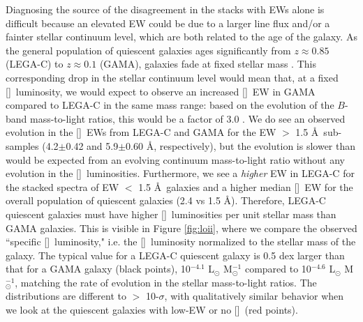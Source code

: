\documentclass[twocolumn,natbib,iop,hyperref]{aastex62}
\newcommand{\oii}{[\ion{O}{2}]}
\begin{document}
Diagnosing the source of the disagreement in the stacks with EWs alone is difficult because an elevated EW could be due to a larger line flux and/or a fainter stellar continuum level, which are both related to the age of the galaxy.  As the general population of quiescent galaxies ages significantly from $z\approx0.85$ (LEGA-C) to $z\approx0.1$ (GAMA), galaxies  fade at fixed stellar mass \cite[e.g.][]{2005ApJ...633..174T}.  This corresponding drop in the stellar continuum level would mean that, at a fixed \oii\ luminosity, we would expect to observe an increased \oii\ EW in GAMA compared to LEGA-C in the same mass range: based on the evolution of the $B$-band mass-to-light ratios, this would be a factor of 3.0 \citep{2005ApJ...631..145V}.  We do see an observed evolution in the \oii\ EWs from LEGA-C and GAMA for the EW $>$ 1.5 \AA\ sub-samples (4.2$\pm$0.42 and 5.9$\pm$0.60 \AA, respectively), but the evolution is slower than would be expected from an evolving continuum mass-to-light ratio without any evolution in the \oii\ luminosities.  Furthermore, we see a \textit{higher} EW in LEGA-C for the stacked spectra of EW $<$ 1.5 \AA\ galaxies and a higher median \oii\ EW for the overall population of quiescent galaxies (2.4 vs 1.5 \AA).  Therefore, LEGA-C quiescent galaxies must have higher \oii\ luminosities per unit stellar mass than GAMA galaxies.  This is visible in Figure \ref{fig:loii}, where we compare the observed ``specific \oii\ luminosity," i.e. the \oii\ luminosity normalized to the stellar mass of the galaxy.  The typical value for a LEGA-C quiescent galaxy is 0.5 dex larger than that for a GAMA galaxy (black points), 10$^{-4.1}$ L$_{\odot}$ M$_{\odot}^{-1}$ compared to 10$^{-4.6}$ L$_{\odot}$ M$_{\odot}^{-1}$, matching the rate of evolution in the stellar mass-to-light ratios.  The distributions are different to $>$ 10-$\sigma$, with qualitatively similar behavior when we look at the quiescent galaxies with low-EW or no \oii\ (red points). 
\end{document}
